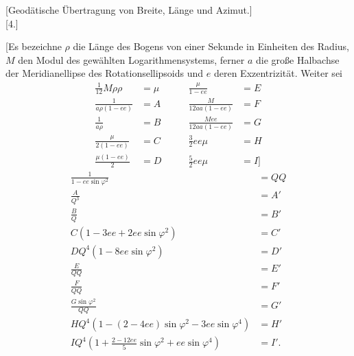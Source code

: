 \par\clearpage
\noindent{}\makebox[12mm][r]{}\par\medskip

\bigskip
\begin{center}
[Geodätische Übertragung von Breite, Länge und Azimut.]\\[.8ex]
{[4.]}
\end{center}
[Es bezeichne \(\rho\) die Länge des Bogens von einer Sekunde in Einheiten des
Radius, \(M\) den Modul des gewählten Logarithmensystems, ferner \(a\) die
große Halbachse der Meridianellipse des Rotationsellipsoids und \(e\) deren
Exzentrizität. Weiter sei
\[
\begin{alignedat}{2}
\tfrac1{12}M\rho\rho&=\mu &\qquad \frac{\mu}{1-ee}&=E\\
\frac1{a\rho(1-ee)}&=A &\qquad \frac{M}{12aa(1-ee)}&=F\\
\frac1{a\rho}&=B &\qquad \frac{Mee}{12aa(1-ee)}&=G\\
\frac{\mu}{2(1-ee)}&=C &\qquad \tfrac32 ee\mu&=H\\
\frac{\mu(1-ee)}2&=D &\qquad \tfrac52 ee\mu&=I]
\end{alignedat}
\]
\[
\begin{aligned}
\frac1{1-ee\sin\varphi^2}&=QQ\\
\frac A{Q^3}&=A'\\
\frac BQ&=B'\\[.5ex]
C(1-3ee+2ee\sin\varphi^2)&=C'\\
DQ^4(1-8ee\sin\varphi^2)&=D'\\[.5ex]
\frac E{QQ}&=E'\\
\frac F{QQ}&=F'\\
\frac{G\sin\varphi^2}{QQ}&=G'\\[.5ex]
HQ^4(1-(2-4ee)\sin\varphi^2-3ee\sin\varphi^4)&=H'\\
IQ^4\left(1+\frac{2-12ee}{5}\sin\varphi^2+ee\sin\varphi^4\right)&=I'.
\end{aligned}
\]
\par

\par\clearpage
\noindent\makebox[12mm][l]{}\par\medskip

